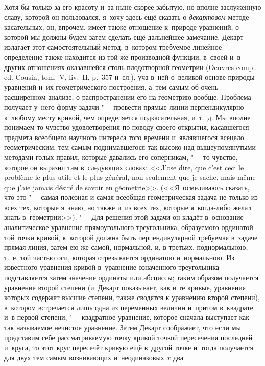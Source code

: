 Хотя бы только за его красоту и~за ныне скорее забытую, но вполне заслуженную
славу, которой он пользовался, я~хочу здесь ещё сказать о {\em декартовом}
методе касательных; он, впрочем, имеет также отношение к~природе уравнений, о
которой мы должны будем затем сделать ещё дальнейшее замечание. Декарт излагает
этот самостоятельный метод, в~котором требуемое линейное определение также
находится из той же производной функции, в~своей и~в других отношениях
оказавшейся столь плодотворной геометрии (Oeuvres compl. ed. Cousin, tom.~V,
liv.~II, p.~357 и~сл.), уча в~ней о~великой основе природы уравнений и~их
геометрического построения, а~тем самым об очень расширенном анализе, о
распространении его на геометрию вообще. Проблема получает у~него форму задачи
"--- провести прямые линии перпендикулярно к~любому месту кривой, чем
определяется подкасательная, и~т.~д. Мы вполне понимаем то чувство
удовлетворения по поводу своего открытия, касавшегося предмета всеобщего
научного интереса того времени и~являвшегося всецело геометрическим, тем самым
поднимавшегося так высоко над вышеупомянутыми методами голых правил, которые
давались его соперникам, "--- то чувство, которое он выразил там в~следующих
словах: <<J’ose dire, que c’est ceci le problème le plus utile et le plus
général, non seulement que je sache, mais même que j’aie jamais désiré de
savoir en géometrie>>. (<<Я~осмеливаюсь сказать, что это "--- самая полезная и
самая всеобщая геометрическая задача не только из всех тех, которые я~знаю, но
также и~из всех тех, которые я~когда-либо желал знать в~геометрии>>). "--- Для
решения этой задачи он кладёт в~основание аналитическое уравнение
прямоугольного треугольника, образуемого ординатой той точки кривой, к~которой
должна быть перпендикулярной требуемая в~задаче прямая линия, затем ею же
самой, нормальной, и, в-третьих, поднормальною, т.~е. той частью оси, которая
отрезывается ординатою и~нормальною. Из известного уравнения кривой в~уравнение
означенного треугольника подставляется затем значение ординаты или абсциссы;
таким образом получается уравнение второй степени (и~Декарт показывает, как и
те кривые, уравнения которых содержат высшие степени, также сводятся к
уравнению второй степени), в~котором встречается лишь одна из переменных
величин и~притом в~квадрате и~в первой степени, "--- квадратное уравнение,
которое сначала выступает как так называемое нечистое уравнение. Затем Декарт
соображает, что если мы представим себе рассматриваемую точку кривой точкой
пересечения последней и~круга, то этот круг пересечёт кривую ещё в~другой точке
и~тогда получается для двух тем самым возникающих и~неодинаковых $x$ два
